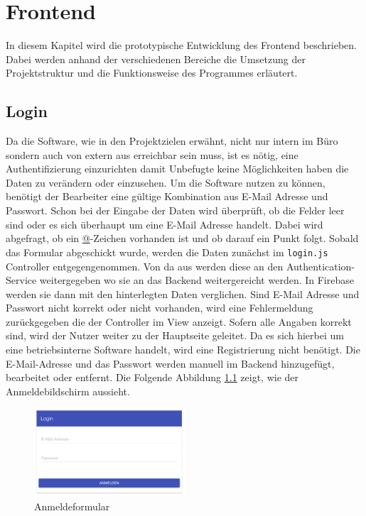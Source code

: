 \chapter{Frontend}
\label{chap_frontend}
In diesem Kapitel wird die prototypische Entwicklung des Frontend beschrieben. Dabei werden anhand der verschiedenen Bereiche die Umsetzung der
Projektstruktur und die Funktionsweise des Programmes erläutert.

\section{Login}
Da die Software, wie in den Projektzielen erwähnt, nicht nur intern im Büro sondern auch von extern aus erreichbar sein muss, ist es nötig, eine Authentifizierung einzurichten damit Unbefugte keine Möglichkeiten haben die Daten zu verändern oder einzusehen. Um die Software nutzen zu können, benötigt der Bearbeiter eine gültige Kombination aus E-Mail Adresse und Passwort. Schon bei der Eingabe der Daten wird überprüft, ob die Felder leer sind oder es sich überhaupt um eine E-Mail Adresse handelt. Dabei wird abgefragt, ob ein \url{@}-Zeichen vorhanden ist und ob darauf ein Punkt folgt.
Sobald das Formular abgeschickt wurde, werden die Daten zunächst im \texttt{login.js} Controller entgegengenommen. Von da aus werden diese an den Authentication-Service weitergegeben wo sie an das Backend weitergereicht werden. In Firebase werden sie dann mit den hinterlegten Daten verglichen. Sind E-Mail Adresse und Passwort nicht korrekt oder nicht vorhanden, wird eine Fehlermeldung zurückgegeben die der Controller im View anzeigt. Sofern alle Angaben korrekt sind, wird der Nutzer weiter zu der Hauptseite geleitet.
Da es sich hierbei um eine betriebsinterne Software handelt, wird eine Registrierung nicht benötigt. Die E-Mail-Adresse und das Passwort werden manuell im Backend hinzugefügt, bearbeitet oder entfernt. Die Folgende Abbildung \ref{frontend_login} zeigt, wie der Anmeldebildschirm aussieht.

\begin{figure}[H]
\centering\includegraphics[width=0.5\textwidth]{images/frontend_login.png}
\caption{Anmeldeformular}
\label{frontend_login}
\end{figure}

